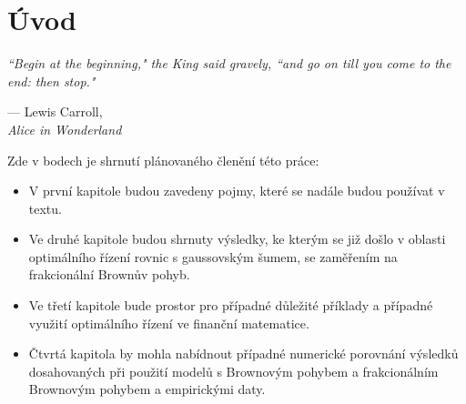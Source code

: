 
\chapter*{Úvod}

\epigraph{\textit{``Begin at the beginning," the King said gravely, ``and go on
till you come to the end: then stop."}}{--- \textup{Lewis Carroll},\\ \textit{
Alice in Wonderland}}

Zde v bodech je shrnutí plánovaného členění této práce:
\begin{itemize}
    \item V první kapitole budou zavedeny pojmy, které se nadále budou používat
        v textu.
    \item Ve druhé kapitole budou shrnuty výsledky, ke kterým se již došlo v
        oblasti optimálního řízení rovnic s gaussovským šumem, se zaměřením na
        frakcionální Brownův pohyb.
    \item Ve třetí kapitole bude prostor pro případné důležité příklady a
        případné využití optimálního řízení ve finanční matematice.
    \item Čtvrtá kapitola by mohla nabídnout případné numerické porovnání výsledků
        dosahovaných při použití modelů s Brownovým pohybem a frakcionálním
        Brownovým pohybem a empirickými daty.
\end{itemize}




